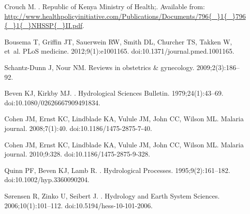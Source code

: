 \documentclass[10pt,letterpaper]{article}\usepackage[]{graphicx}\usepackage[]{color}
\begin{document}
\begin{thebibliography}{10}

Crouch M.
.
\newblock Republic of Kenya Ministry of Health;.
\newblock Available from:
  \url{http://www.healthpolicyinitiative.com/Publications/Documents/796{\_}1{\_}796{\_}1{\_}NHSSP{\_}II.pdf}.

Bousema T, Griffin JT, Sauerwein RW, Smith DL, Churcher TS, Takken W, et~al.
\newblock PLoS medicine. 2012;9(1):e1001165.
\newblock doi:{10.1371/journal.pmed.1001165}.

Schantz-Dunn J, Nour NM.
\newblock Reviews in obstetrics {\&} gynecology. 2009;2(3):186--92.

Beven KJ, Kirkby MJ.
.
\newblock Hydrological Sciences Bulletin. 1979;24(1):43--69.
\newblock doi:{10.1080/02626667909491834}.

Cohen JM, Ernst KC, Lindblade KA, Vulule JM, John CC, Wilson ML.
\newblock Malaria journal. 2008;7(1):40.
\newblock doi:{10.1186/1475-2875-7-40}.

Cohen JM, Ernst KC, Lindblade KA, Vulule JM, John CC, Wilson ML.
\newblock Malaria journal. 2010;9:328.
\newblock doi:{10.1186/1475-2875-9-328}.

Quinn PF, Beven KJ, Lamb R.
.
\newblock Hydrological Processes. 1995;9(2):161--182.
\newblock doi:{10.1002/hyp.3360090204}.

Sørensen R, Zinko U, Seibert J.
.
\newblock Hydrology and Earth System Sciences. 2006;10(1):101--112.
\newblock doi:{10.5194/hess-10-101-2006}.


\end{thebibliography}
\end{document}
